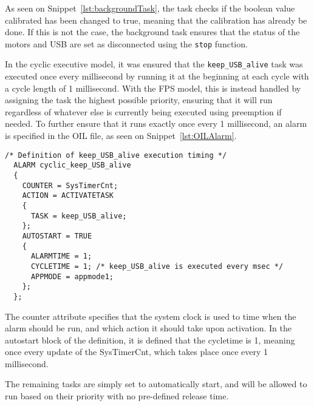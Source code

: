 As seen on Snippet~\ref{lst:backgroundTask}, the task checks if the boolean value calibrated has been changed to true, meaning that the calibration has already be done.
If this is not the case, the background task ensures that the status of the motors and USB are set as disconnected using the \texttt{stop} function.

In the cyclic executive model, it was ensured that the \texttt{keep\_USB\_alive} task was executed once every millisecond by running it at the beginning at each cycle with a cycle length of 1 millisecond.
With the FPS model, this is instead handled by assigning the task the highest possible priority, ensuring that it will run regardless of whatever else is currently being executed using preemption if needed.
To further ensure that it runs exactly once every 1 millisecond, an alarm is specified in the OIL file, as seen on Snippet~\ref{lst:OILAlarm}.

\begin{lstlisting}[language=CSharp,label={lst:OILAlarm},caption={Alarm in the OIL}]
  /* Definition of keep_USB_alive execution timing */
  ALARM cyclic_keep_USB_alive
  {
    COUNTER = SysTimerCnt;
    ACTION = ACTIVATETASK
    {
      TASK = keep_USB_alive;
    };
    AUTOSTART = TRUE
    {
      ALARMTIME = 1;
      CYCLETIME = 1; /* keep_USB_alive is executed every msec */
      APPMODE = appmode1;
    };
  };
\end{lstlisting}

The counter attribute specifies that the system clock is used to time when the alarm should be run, and which action it should take upon activation.
In the autostart block of the definition, it is defined that the cycletime is 1, meaning once every update of the SysTimerCnt, which takes place once every 1 millisecond.

The remaining tasks are simply set to automatically start, and will be allowed to run based on their priority with no pre-defined release time.